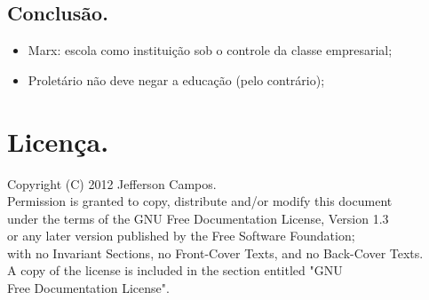 \documentclass[a4paper,12pt]{article}
\begin{document}
\subsection{Conclusão.}
\begin{itemize}
\item Marx: escola como instituição sob o controle da classe empresarial;
\item Proletário não deve negar a educação (pelo contrário);
\end{itemize}

\section{Licença.}

Copyright (C) 2012 Jefferson Campos.\\
Permission is granted to copy, distribute and/or modify this document\\
under the terms of the GNU Free Documentation License, Version 1.3\\
or any later version published by the Free Software Foundation;\\
with no Invariant Sections, no Front-Cover Texts, and no Back-Cover Texts.\\
A copy of the license is included in the section entitled "GNU\\
Free Documentation License".
\end{document}
